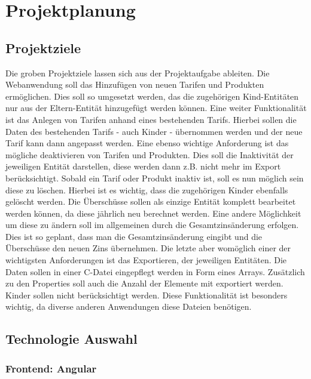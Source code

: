 \chapter{Projektplanung}\label{ch:data}
\section{Projektziele}
Die groben Projektziele lassen sich aus der Projektaufgabe ableiten. 
Die Webanwendung soll das Hinzufügen von neuen Tarifen und Produkten ermöglichen. Dies soll so umgesetzt werden, das die zugehörigen Kind-Entitäten nur aus der Eltern-Entität hinzugefügt werden können.
Eine weiter Funktionalität ist das Anlegen von Tarifen anhand eines bestehenden Tarifs. 
Hierbei sollen die Daten des bestehenden Tarifs - auch Kinder - übernommen werden und der neue Tarif kann dann angepasst werden.
Eine ebenso wichtige Anforderung ist das mögliche deaktivieren von Tarifen und Produkten. Dies soll die Inaktivität der jeweiligen Entität darstellen, diese werden dann z.B. nicht mehr im Export berücksichtigt.
Sobald ein Tarif oder Produkt inaktiv ist, soll es nun möglich sein diese zu löschen. Hierbei ist es wichtig, dass die zugehörigen Kinder ebenfalls gelöscht werden. 
Die Überschüsse sollen als einzige Entität komplett bearbeitet werden können, da diese jährlich neu berechnet werden. Eine andere Möglichkeit um diese zu ändern soll im allgemeinen durch die Gesamtzinsänderung erfolgen.
Dies ist so geplant, dass man die Gesamtzinsänderung eingibt und die Überschüsse den neuen Zins übernehmen. Die letzte aber womöglich einer der wichtigsten Anforderungen ist das Exportieren, der jeweiligen Entitäten.
Die Daten sollen in einer C-Datei eingepflegt werden in Form eines Arrays. Zusätzlich zu den Properties soll auch die Anzahl der Elemente mit exportiert werden. Kinder sollen nicht berücksichtigt werden.
Diese Funktionalität ist besonders wichtig, da diverse anderen Anwendungen diese Dateien benötigen.

\section{Technologie Auswahl}
\subsection{Frontend: Angular}
